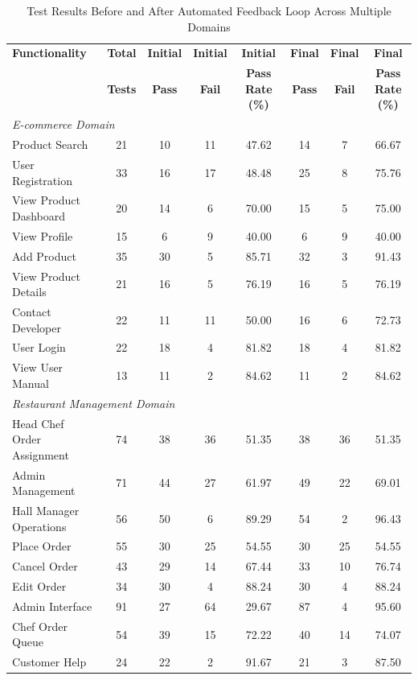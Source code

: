 \begin{landscape}
\begin{table}[h]
\centering
\caption{Test Results Before and After Automated Feedback Loop Across Multiple Domains}
\label{tab:combined-test-results}
\small
\begin{tabular}{lccccccc}
\toprule
\textbf{Functionality} & \textbf{Total} & \textbf{Initial} & \textbf{Initial} & \textbf{Initial} & \textbf{Final} & \textbf{Final} & \textbf{Final} \\
 & \textbf{Tests} & \textbf{Pass} & \textbf{Fail} & \textbf{Pass Rate (\%)} & \textbf{Pass} & \textbf{Fail} & \textbf{Pass Rate (\%)} \\
\midrule
\multicolumn{8}{l}{\textit{E-commerce Domain}} \\
Product Search & 21 & 10 & 11 & 47.62 & 14 & 7 & 66.67 \\
User Registration & 33 & 16 & 17 & 48.48 & 25 & 8 & 75.76 \\
View Product Dashboard & 20 & 14 & 6 & 70.00 & 15 & 5 & 75.00 \\
View Profile & 15 & 6 & 9 & 40.00 & 6 & 9 & 40.00 \\
Add Product & 35 & 30 & 5 & 85.71 & 32 & 3 & 91.43 \\
View Product Details & 21 & 16 & 5 & 76.19 & 16 & 5 & 76.19 \\
Contact Developer & 22 & 11 & 11 & 50.00 & 16 & 6 & 72.73 \\
User Login & 22 & 18 & 4 & 81.82 & 18 & 4 & 81.82 \\
View User Manual & 13 & 11 & 2 & 84.62 & 11 & 2 & 84.62 \\
\midrule
\multicolumn{8}{l}{\textit{Restaurant Management Domain}} \\
Head Chef Order Assignment & 74 & 38 & 36 & 51.35 & 38 & 36 & 51.35 \\
Admin Management & 71 & 44 & 27 & 61.97 & 49 & 22 & 69.01 \\
Hall Manager Operations & 56 & 50 & 6 & 89.29 & 54 & 2 & 96.43 \\
Place Order & 55 & 30 & 25 & 54.55 & 30 & 25 & 54.55 \\
Cancel Order & 43 & 29 & 14 & 67.44 & 33 & 10 & 76.74 \\
Edit Order & 34 & 30 & 4 & 88.24 & 30 & 4 & 88.24 \\
Admin Interface & 91 & 27 & 64 & 29.67 & 87 & 4 & 95.60 \\
Chef Order Queue & 54 & 39 & 15 & 72.22 & 40 & 14 & 74.07 \\
Customer Help & 24 & 22 & 2 & 91.67 & 21 & 3 & 87.50 \\

\end{tabular}
\end{table}
\end{landscape}
